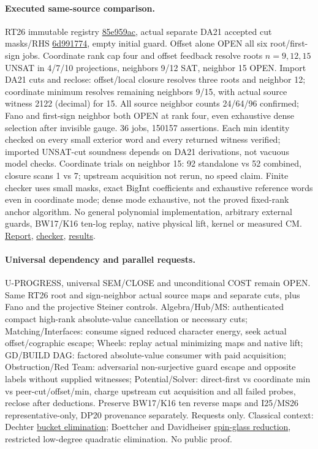 \documentclass[11pt]{article}
\begin{document}
\paragraph{Executed same-source comparison.}
RT26 immutable registry \href{https://github.com/j15marti/pnp/commit/85e959ac861572a2411b9858da0d58d7c72ac780}{85e959ac}, actual separate DA21 accepted cut masks/RHS \href{https://github.com/j15marti/pnp/commit/6d9917749c8438435d889b31e5c81ed0fc410e9a}{6d991774}, empty initial guard. Offset alone OPEN all six root/first-sign jobs. Coordinate rank cap four and offset feedback resolve roots $n=9,12,15$ UNSAT in 4/7/10 projections, neighbors 9/12 SAT, neighbor 15 OPEN. Import DA21 cuts and reclose: offset/local closure resolves three roots and neighbor 12; coordinate minimum resolves remaining neighbors 9/15, with actual source witness 2122 (decimal) for 15. All source neighbor counts 24/64/96 confirmed; Fano and first-sign neighbor both OPEN at rank four, even exhaustive dense selection after invisible gauge. 36 jobs, 150157 assertions. Each min identity checked on every small exterior word and every returned witness verified; imported UNSAT-cut soundness depends on DA21 derivations, not vacuous model checks. Coordinate trials on neighbor 15: 92 standalone vs 52 combined, closure scans 1 vs 7; upstream acquisition not rerun, no speed claim. Finite checker uses small masks, exact BigInt coefficients and exhaustive reference words even in coordinate mode; dense mode exhaustive, not the proved fixed-rank anchor algorithm. No general polynomial implementation, arbitrary external guards, BW17/K16 ten-log replay, native physical lift, kernel or measured CM. \href{https://github.com/j15marti/pnp/commit/6ad20dc9829504bb6228d18f5dab644cf4e168d5}{Report}, \href{https://github.com/j15marti/pnp/commit/da2bd6ab60b64acfbd5aa413ada6dbe3502fe23b}{checker}, \href{https://github.com/j15marti/pnp/commit/eb8a801242162c8d91b510ff7992f1e6414e11d9}{results}.
\paragraph{Universal dependency and parallel requests.}
U-PROGRESS, universal SEM/CLOSE and unconditional COST remain OPEN. Same RT26 root and sign-neighbor actual source maps and separate cuts, plus Fano and the projective Steiner controls. Algebra/Hub/MS: authenticated compact high-rank absolute-value cancellation or necessary cuts; Matching/Interfaces: consume signed reduced character energy, seek actual offset/cographic escape; Wheels: replay actual minimizing maps and native lift; GD/BUILD DAG: factored absolute-value consumer with paid acquisition; Obstruction/Red Team: adversarial non-surjective guard escape and opposite labels without supplied witnesses; Potential/Solver: direct-first vs coordinate min vs peer-cut/offset/min, charge upstream cut acquisition and all failed probes, reclose after deductions. Preserve BW17/K16 ten reverse maps and I25/MS26 representative-only, DP20 provenance separately. Requests only. Classical context: Dechter \href{https://arxiv.org/abs/1302.3572}{bucket elimination}; Boettcher and Davidheiser \href{https://doi.org/10.1103/PhysRevB.77.214432}{spin-glass reduction}, restricted low-degree quadratic elimination. No public proof.
\end{document}

